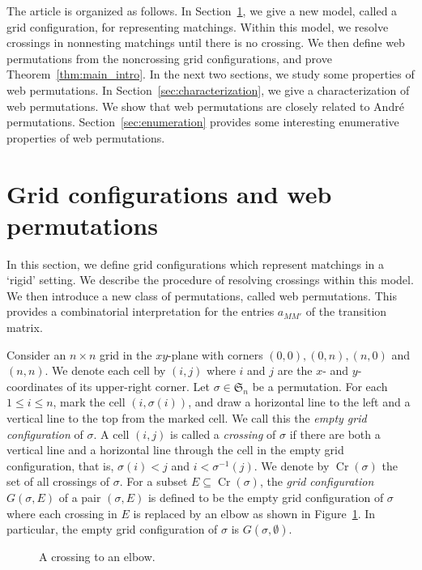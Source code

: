 \documentclass[reqno,12pt]{amsart}
\theoremstyle{definition}
\theoremstyle{remark}
\newcommand\Cr{\operatorname{Cr}}
\newcommand\Cross[2]
{\draw (#1-0.5,#2)--(#1-0.5,#2-1);
\draw (#1,#2-0.5)--(#1-1,#2-0.5); }
\newcommand\Asmooth[2]
{\draw (#1,#2-0.5) .. controls (#1-0.45,#2-0.45) and (#1-0.45,#2-0.45) .. (#1-0.5,#2);
\draw (#1-1,#2-0.5) .. controls (#1-0.55,#2-0.55) and (#1-0.55,#2-0.55) .. (#1-0.5,#2-1); }
\newcommand\SYM{\mathfrak{S}}
\begin{document}
The article is organized as follows.
In Section~\ref{sec:grid configuration}, we give a new model,
called a grid configuration, for representing matchings.
Within this model, we resolve crossings in nonnesting matchings
until there is no crossing.
We then define web permutations from the noncrossing grid configurations,
and prove Theorem~\ref{thm:main_intro}.
In the next two sections, we study some properties of web permutations.
In Section~\ref{sec:characterization}, we give a characterization of
web permutations. We show that web permutations are closely related to
Andr\'e permutations.
Section~\ref{sec:enumeration} provides some interesting enumerative properties
of web permutations.

\section{Grid configurations and web permutations}
\label{sec:grid configuration}
In this section, we define grid configurations which represent matchings
in a `rigid' setting.
We describe the procedure of resolving crossings within this model.
We then introduce a new class of permutations, called web permutations.
This provides a combinatorial interpretation for the entries \( a_{MM'} \) of the transition
matrix.

Consider an $n \times n$ grid in the $xy$-plane with corners
$(0,0), (0,n), (n,0)$ and $(n,n)$.
We denote each cell by $(i,j)$ where $i$ and $j$ are the $x$- and $y$-coordinates of its upper-right corner.
Let $\sigma\in\SYM_n$ be a permutation. For each $1\le i\le n$, mark the cell \( (i,\sigma(i)) \),
and draw a horizontal line to the left and a vertical line to the top from the marked cell.
We call this the \emph{empty grid configuration} of \( \sigma \).
A cell $(i,j)$ is called a \emph{crossing} of \( \sigma \) if
there are both a vertical line and a horizontal line through the cell
in the empty grid configuration, that is,
\( \sigma(i) < j \) and \( i < \sigma^{-1}(j) \).
We denote by \( \Cr(\sigma) \) the set of all crossings of \( \sigma \).
For a subset \( E\subseteq\Cr(\sigma) \),
the \emph{grid configuration} \( G(\sigma,E) \) of a pair \( (\sigma, E) \)
is defined to be the empty grid configuration of \( \sigma \)
where each crossing in \( E \)
is replaced by an elbow as shown in Figure~\ref{fig:A crossing to an elbow}.
In particular, the empty grid
configuration of \( \sigma \) is \( G(\sigma,\emptyset) \).
\begin{figure}
  \centering
  \caption{A crossing to an elbow.}
  \label{fig:A crossing to an elbow}
\end{figure}
\end{document}

